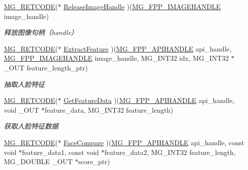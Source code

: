 \begin{DoxyCompactItemize}
\hyperlink{_m_g___common_8h_a38fecb61b8c39592ddb51f75d4a5c5e7}{M\+G\+\_\+\+R\+E\+T\+C\+O\+DE}($\ast$ \hyperlink{struct_m_g___f_a_c_e_p_p___a_p_i___f_u_n_c_t_i_o_n_s___t_y_p_e_aaadd12cc76f4cf18ed48a5f9f3bc8bfc}{Release\+Image\+Handle} )(\hyperlink{_m_g___facepp_8h_a3492210206745444514ed588709ea666}{M\+G\+\_\+\+F\+P\+P\+\_\+\+I\+M\+A\+G\+E\+H\+A\+N\+D\+LE} image\+\_\+handle)
\begin{DoxyCompactList}\small\item\em 释放图像句柄（handle） \end{DoxyCompactList}\item 
\hyperlink{_m_g___common_8h_a38fecb61b8c39592ddb51f75d4a5c5e7}{M\+G\+\_\+\+R\+E\+T\+C\+O\+DE}($\ast$ \hyperlink{struct_m_g___f_a_c_e_p_p___a_p_i___f_u_n_c_t_i_o_n_s___t_y_p_e_a0a7a742dce1d56702cce167e818fc06c}{Extract\+Feature} )(\hyperlink{_m_g___facepp_8h_ada15f635ef909e9aca52824dd580da40}{M\+G\+\_\+\+F\+P\+P\+\_\+\+A\+P\+I\+H\+A\+N\+D\+LE} api\+\_\+handle, \hyperlink{_m_g___facepp_8h_a3492210206745444514ed588709ea666}{M\+G\+\_\+\+F\+P\+P\+\_\+\+I\+M\+A\+G\+E\+H\+A\+N\+D\+LE} image\+\_\+handle, M\+G\+\_\+\+I\+N\+T32 idx, M\+G\+\_\+\+I\+N\+T32 $\ast$\+\_\+\+O\+UT feature\+\_\+length\+\_\+ptr)
\begin{DoxyCompactList}\small\item\em 抽取人脸特征 \end{DoxyCompactList}\item 
\hyperlink{_m_g___common_8h_a38fecb61b8c39592ddb51f75d4a5c5e7}{M\+G\+\_\+\+R\+E\+T\+C\+O\+DE}($\ast$ \hyperlink{struct_m_g___f_a_c_e_p_p___a_p_i___f_u_n_c_t_i_o_n_s___t_y_p_e_aa8ba34245d853387adfd47b2e18484fc}{Get\+Feature\+Data} )(\hyperlink{_m_g___facepp_8h_ada15f635ef909e9aca52824dd580da40}{M\+G\+\_\+\+F\+P\+P\+\_\+\+A\+P\+I\+H\+A\+N\+D\+LE} api\+\_\+handle, void \+\_\+\+O\+UT $\ast$feature\+\_\+data, M\+G\+\_\+\+I\+N\+T32 feature\+\_\+length)
\begin{DoxyCompactList}\small\item\em 获取人脸特征数据 \end{DoxyCompactList}\item 
\hyperlink{_m_g___common_8h_a38fecb61b8c39592ddb51f75d4a5c5e7}{M\+G\+\_\+\+R\+E\+T\+C\+O\+DE}($\ast$ \hyperlink{struct_m_g___f_a_c_e_p_p___a_p_i___f_u_n_c_t_i_o_n_s___t_y_p_e_ad4dfe5f8f35f050cf21d003644c3826b}{Face\+Compare} )(\hyperlink{_m_g___facepp_8h_ada15f635ef909e9aca52824dd580da40}{M\+G\+\_\+\+F\+P\+P\+\_\+\+A\+P\+I\+H\+A\+N\+D\+LE} api\+\_\+handle, const void $\ast$feature\+\_\+data1, const void $\ast$feature\+\_\+data2, M\+G\+\_\+\+I\+N\+T32 feature\+\_\+length, M\+G\+\_\+\+D\+O\+U\+B\+LE \+\_\+\+O\+UT $\ast$score\+\_\+ptr)

\end{DoxyCompactItemize}
